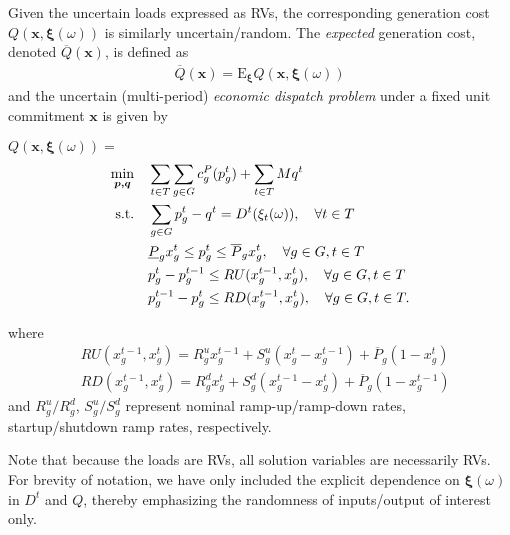 \documentclass[conference]{IEEEtran}
\newcommand{\xivec}{{\boldsymbol{\xi}}}
\newcommand{\xvec}{{\boldsymbol{x}}}
\begin{document}
Given the uncertain loads expressed as RVs, the corresponding generation cost 
$Q(\xvec,\xivec(\omega))$ is similarly uncertain/random. The
\emph{expected} generation cost, denoted $\overline Q(\boldsymbol x)$, is
defined as 
\begin{subequations}\label{buc}
\begin{align}
\overline Q(\boldsymbol x) = \mathrm{E}_{\boldsymbol \xi} Q(\boldsymbol x, \xivec(\omega))
\end{align}
\end{subequations}
\noindent and the uncertain (multi-period) \emph{economic dispatch problem} under a 
fixed unit commitment $\boldsymbol x$ is given by

\smallskip
\noindent $Q(\boldsymbol x, \xivec(\omega)) =$
\begin{subequations}\label{eq:sed}
\label{eq:rec_obj}
\begin{align}
\min_{\boldsymbol {p, q}} \quad & \sum_{t \in T} \sum_{g \in G} c_g^P(p_g^t) + \sum_{t \in T} Mq^t \label{ed_mod_obj}\\
\textmd{s.t.}\quad & \sum_{g \in   G}  p_g^t - q^t = D^t(\xi_t(\omega)), \quad \forall t \in T \label{ed_mod_bal}\\
&\underline P_g x_g^t \leq  p_g^t \leq \overline P_g x_g^t, \quad   \forall g \in G, t \in T \label{ed_mod_gen_lim} \\
&p_g^{t} -  p_g^{t-1} \leq RU(x_g^{t-1}, x_g^t), \quad  \forall g \in G, t \in T \label{ed_mod_ru} \\
&p_g^{t-1}-  p_g^t\leq RD(x_g^{t-1}, x_g^t), \quad  \forall g \in G, t \in T \label{ed_mod_rd}.
\end{align}
\end{subequations}

\noindent where 
\begin{align*}
&RU(x_g^{t-1}, x_g^t) = R_g^u x_g^{t-1} + {S}_g^u (x_g^t-x_g^{t-1}) + \overline P_g ( 1-x_g^t) \\
&RD(x_g^{t-1}, x_g^t) = R_g^d x_g^{t}+S_g^d (x_g^{t-1}-x_g^t)  +\overline P_g(1-x_g^{t-1}) 
\end{align*}
\noindent and $R_g^u/R_g^d$, $S_g^u/S_g^d$ represent nominal
ramp-up/ramp-down rates, startup/shutdown ramp rates, respectively. 

Note that because the loads are RVs, all solution variables are necessarily
RVs. For brevity of notation, we have only included the explicit dependence
on $\xivec(\omega)$ in $D^t$ and $Q$, thereby emphasizing the randomness of
inputs/output of interest only.
\end{document}
